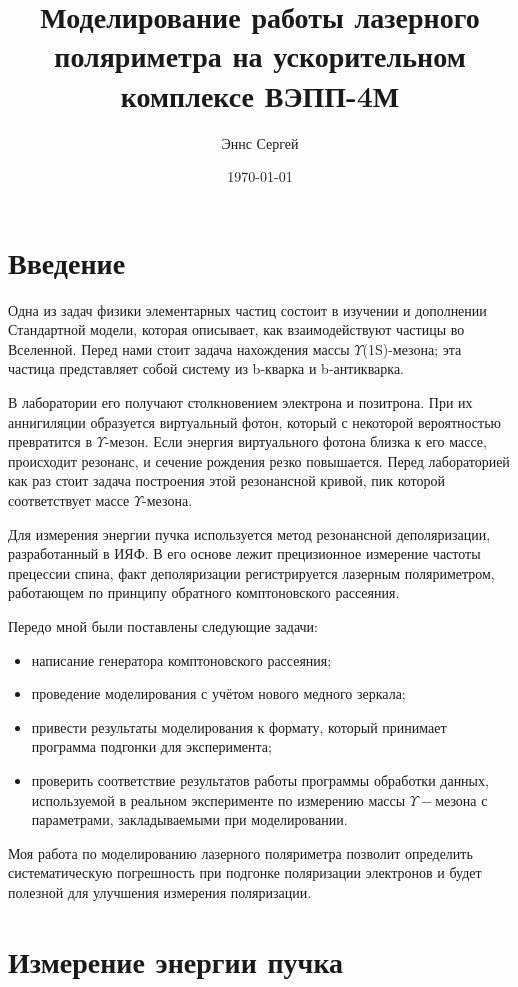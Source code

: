 \documentclass[12pt,a4paper]{article}
\begin{document}
\title{\textbf{Моделирование работы лазерного поляриметра на ускорительном комплексе ВЭПП-4М}}
\author{Эннс Сергей}
\date{\today}
\maketitle

\section*{Введение}

Одна из задач физики элементарных частиц состоит в изучении и дополнении
Стандартной модели, которая описывает, как взаимодействуют частицы во
Вселенной. Перед нами стоит задача нахождения массы $\Upsilon$(1S)-мезона; эта
частица представляет собой систему из b-кварка и b-антикварка. 

В лаборатории его получают столкновением электрона и позитрона. При их аннигиляции образуется виртуальный фотон, который с некоторой вероятностью превратится в $\Upsilon$-мезон. Если энергия виртуального фотона близка к его массе, происходит резонанс, и сечение рождения резко повышается. Перед лабораторией как раз стоит задача построения этой резонансной кривой, пик которой соответствует массе $\Upsilon$-мезона.

Для измерения энергии пучка используется метод резонансной деполяризации,
разработанный в ИЯФ. В его основе лежит прецизионное измерение частоты
прецессии спина, факт деполяризации регистрируется лазерным поляриметром,
работающем по принципу обратного комптоновского рассеяния.

Передо мной были поставлены следующие задачи:
\begin{itemize}
\item написание генератора комптоновского рассеяния;
\item проведение моделирования с учётом нового медного зеркала;
\item привести результаты моделирования к формату, который принимает программа подгонки для эксперимента;
\item проверить соответствие результатов работы программы обработки данных, используемой в реальном эксперименте по измерению массы $\Upsilon-$мезона с параметрами, закладываемыми при моделировании.
\end{itemize}
Моя работа по моделированию лазерного поляриметра позволит определить систематическую погрешность при подгонке поляризации электронов и будет полезной для улучшения измерения поляризации.
\section{Измерение энергии пучка}
\end{document}
